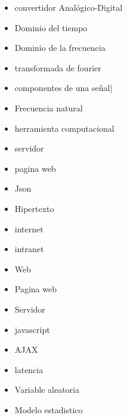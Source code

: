 \begin{itemize}
    \item convertidor Analógico-Digital
    \item Dominio del tiempo
    \item Dominio de la frecuencia
    \item transformada de fourier
    \item componentes de una señal|
    \item Frecuencia natural
    \item herramienta computacional
    \item servidor
    \item pagina web
    \item Json
    \item Hipertexto
    \item internet
    \item intranet
    \item Web
    \item Pagina web
    \item Servidor
    \item javascript
    \item AJAX
    \item latencia
    \item Variable aleatoria
    \item Modelo estadistico
\end{itemize}

